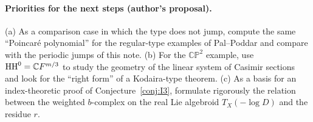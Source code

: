 \paragraph{Priorities for the next steps (author's proposal).}
(a) As a comparison case in which the type does not jump, compute the same ``Poincar\'e polynomial'' for the regular-type examples of Pal--Poddar and compare with the periodic jumps of this note. (b) For the $\mathbb{CP}^2$ example, use $\mathrm{HH}^0=\mathbb C F^{m/3}$ to study the geometry of the linear system of Casimir sections and look for the ``right form'' of a Kodaira-type theorem. (c) As a basis for an index-theoretic proof of Conjecture~\ref{conj:I3}, formulate rigorously the relation between the weighted $b$-complex on the real Lie algebroid $T_X(-\log D)$ and the residue $r$.

